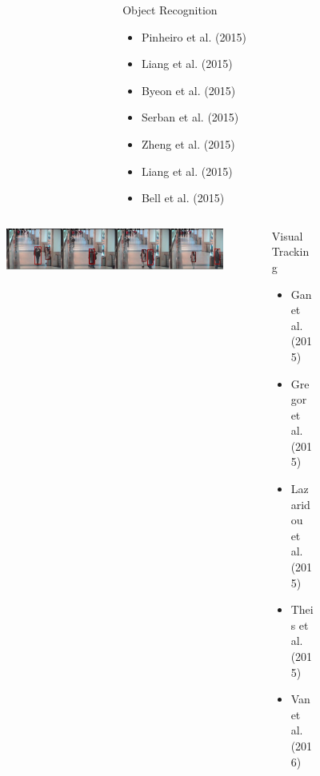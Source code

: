 \documentclass{beamer}
\begin{document}
\begin{frame}
\begin{figure}
\begin{minipage}[t][7cm][t]{\textwidth}
\begin{overprint}
\begin{columns}
\begin{column}{0.6\textwidth}
\begin{figure}[ht]
							\end{figure}
						\end{column}
						\begin{column}{0.4\textwidth}
							\begin{block}{Object Recognition
								}
								\begin{itemize}
									\item Pinheiro et al. (2015) 
									\item Liang et al. (2015)
									\item Byeon et al. (2015)
									\item Serban et al. (2015)
									\item Zheng et al. (2015)
									\item Liang et al. (2015)
									\item Bell et al. (2015)
								\end{itemize}
							\end{block}
						\end{column}
					\end{columns}
					\onslide<7>
					\begin{columns}
						\begin{column}{0.6\textwidth}
							\begin{figure}[ht]
								\centering
								\includegraphics[width=1\linewidth]{images/vt}
								\label{fig:vt}
								
							\end{figure}
						\end{column}
						\begin{column}{0.4\textwidth}
							\begin{block}{Visual Tracking
								}
								\begin{itemize}
									\item Gan et al. (2015) 
									\item Gregor et al. (2015)
									\item Lazaridou et al. (2015)
									\item Theis et al. (2015)
									\item Van et al. (2016)
								\end{itemize}
							\end{block}
						\end{column}
					\end{columns}
					\onslide<8>
					\begin{columns}
						\begin{column}{0.6\textwidth}
						

\end{column}
\end{columns}
\end{overprint}
\end{minipage}
\end{figure}
\end{frame}
\end{document}
